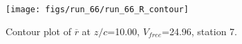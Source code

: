 \begin{figure}[H]
\centering
\texttt{[image: figs/run\_66/run\_66\_R\_contour]}
\caption{Contour plot of $\overline{r}$ at $z/c$=10.00, $V_{free}$=24.96, station 7.}
\end{figure}


